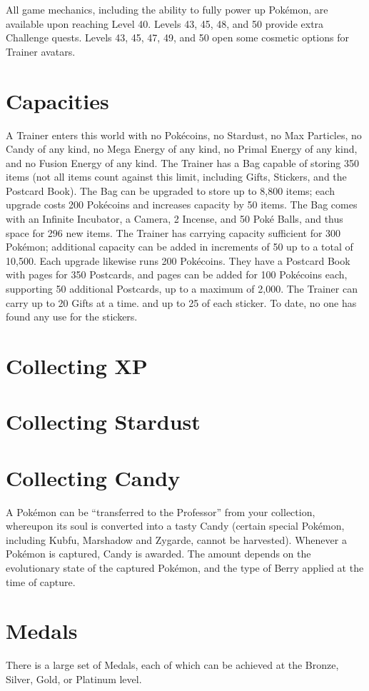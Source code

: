 All game mechanics, including the ability to fully power up Pokémon,
 are available upon reaching Level 40.
Levels 43, 45, 48, and 50 provide extra Challenge quests.
Levels 43, 45, 47, 49, and 50 open some cosmetic options for Trainer avatars.

\section{Capacities}
A Trainer enters this world with no Pokécoins, no Stardust, no Max Particles,
  no Candy of any kind, no Mega Energy of any kind, no Primal Energy of
  any kind, and no Fusion Energy of any kind.
The Trainer has a Bag capable of storing 350 items (not all items
  count against this limit, including Gifts, Stickers, and the Postcard Book).
The Bag can be upgraded to store up to 8,800 items; each
  upgrade costs 200 Pokécoins and increases capacity by 50 items.
The Bag comes with an Infinite Incubator, a Camera, 2 Incense, and 50 Poké Balls,
  and thus space for 296 new items.
The Trainer has carrying capacity sufficient for 300 Pokémon; additional
  capacity can be added in increments of 50 up to a total of 10,500.
Each upgrade likewise runs 200 Pokécoins.
They have a Postcard Book with pages for 350 Postcards, and pages can be
 added for 100 Pokécoins each, supporting 50 additional Postcards, up
 to a maximum of 2,000.
The Trainer can carry up to 20 Gifts at a time. and up to 25 of each sticker.
To date, no one has found any use for the stickers.
\section{Collecting XP}

\section{Collecting Stardust}

\section{Collecting Candy}
A Pokémon can be ``transferred to the Professor'' from your collection,
 whereupon its soul is converted into a tasty Candy (certain special
 Pokémon, including Kubfu, Marshadow and Zygarde, cannot be harvested).
Whenever a Pokémon is captured, Candy is awarded. The amount depends on
 the evolutionary state of the captured Pokémon, and the type of Berry
 applied at the time of capture.

\section{Medals}
There is a large set of Medals, each of which can be achieved at the Bronze,
 Silver, Gold, or Platinum level.

